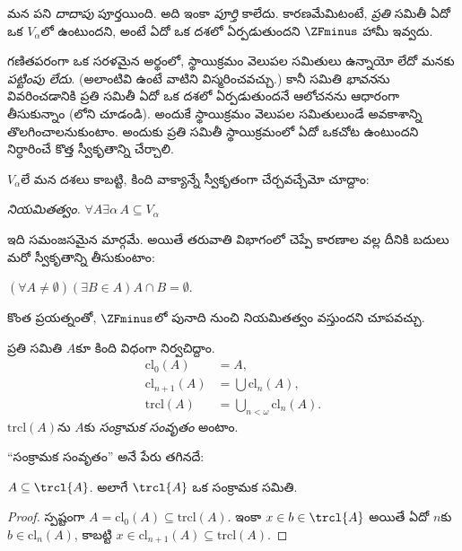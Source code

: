 \documentclass[../../../include/open-logic-section]{subfiles}
\begin{document}


మన పని \emph{దాదాపు} పూర్తయింది. అది ఇంకా \emph{పూర్తి}
కాలేదు. కారణమేమిటంటే, \emph{ప్రతి} సమితీ ఏదో ఒక
$V_\alpha$లో ఉంటుందని, అంటే ఏదో ఒక దశలో ఏర్పడుతుందని
$\ZFminus$ హామీ ఇవ్వదు.

గణితపరంగా ఒక సరళమైన అర్థంలో, స్థాయిక్రమం వెలుపల
సమితులు ఉన్నాయో లేదో మనకు \emph{పట్టింపు లేదు}.
(అలాంటివి ఉంటే వాటిని విస్మరించవచ్చు.) కానీ సమితి
\emph{భావన}ను వివరించడానికి ప్రతి సమితీ ఏదో ఒక దశలో
ఏర్పడుతుందనే ఆలోచనను ఆధారంగా తీసుకున్నాం
(లోని \stageshier{} చూడండి). అందుకే
స్థాయిక్రమం వెలుపల సమితులుండే అవకాశాన్ని తొలగించాలనుకుంటాం.
అందుకు ప్రతి సమితీ స్థాయిక్రమంలో ఏదో ఒకచోట ఉంటుందని
నిర్ధారించే కొత్త స్వీకృతాన్ని చేర్చాలి.

$V_\alpha$లే మన దశలు కాబట్టి, కింది వాక్యాన్నే
స్వీకృతంగా చేర్చవచ్చేమో చూద్దాం:

\begin{defish}
\emph{నియమితత్వం.} $\forall A \exists \alpha\, A \subseteq V_\alpha$
\end{defish}

ఇది సమంజసమైన మార్గమే. అయితే తరువాతి విభాగంలో చెప్పే
కారణాల వల్ల దీనికి బదులు మరో స్వీకృతాన్ని తీసుకుంటాం:

\begin{axiom}[పునాది]
$(\forall A \neq \emptyset)(\exists B \in A)A \cap B = \emptyset$.
\end{axiom}

కొంత ప్రయత్నంతో, $\ZFminus$లో పునాది నుంచి నియమితత్వం
వస్తుందని చూపవచ్చు.
\begin{defn}
ప్రతి సమితి $A$కూ కింది విధంగా నిర్వచిద్దాం.
\begin{align*}
	\text{cl}_0(A) &= A,\\
	\text{cl}_{n+1}(A) &= \bigcup \text{cl}_n(A),\\
	\text{trcl}(A) &= \bigcup_{n < \omega} \text{cl}_{n}(A).
\end{align*}
$\text{trcl}(A)$ను $A$కు \emph{సంక్రామక సంవృతం} అంటాం.
\end{defn}
\noindent
``సంక్రామక సంవృతం'' అనే పేరు తగినదే:
\begin{prop}
$A \subseteq \trcl{A}$. అలాగే $\trcl{A}$ ఒక సంక్రామక సమితి.
\end{prop}

\begin{proof}
స్పష్టంగా $A = \text{cl}_0(A) \subseteq \text{trcl}(A)$. ఇంకా $x
\in b \in \trcl{A}$ అయితే ఏదో $n$కు $b \in \text{cl}_n(A)$, కాబట్టి $x
\in \text{cl}_{n+1}(A) \subseteq \text{trcl}(A)$.
\end{proof}
\end{document}
